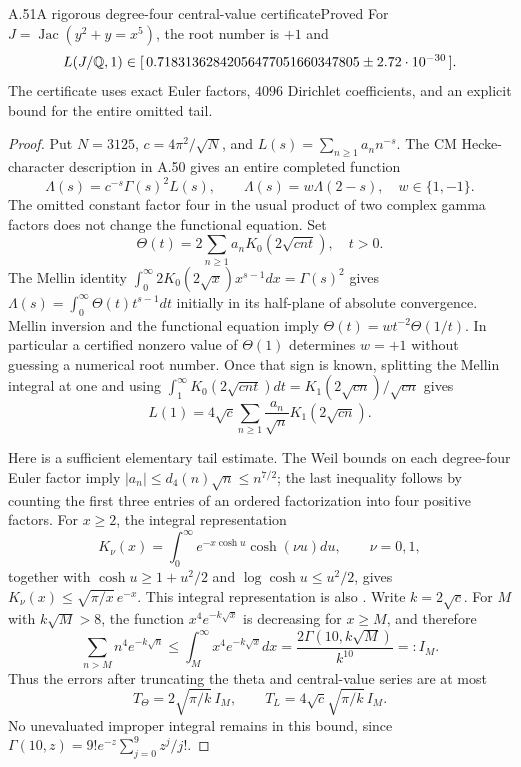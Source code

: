 \begin{statement}{A.51}{A rigorous degree-four central-value certificate}{Proved}
For $J=\operatorname{Jac}(y^2+y=x^5)$, the root number is $+1$ and
\[
 L(J/\mathbb Q,1)\in
 [\,0.71831362842056477051660347805
       \mathbin{\pm}2.72\cdot10^{-30}\,].
\]
The certificate uses exact Euler factors, $4096$ Dirichlet coefficients,
and an explicit bound for the entire omitted tail.
\end{statement}
\begin{proof}
Put $N=3125$, $c=4\pi^2/\sqrt N$, and
$L(s)=\sum_{n\ge1}a_nn^{-s}$. The CM Hecke-character description in A.50
gives an entire completed function
\[
 \Lambda(s)=c^{-s}\Gamma(s)^2L(s),\qquad
 \Lambda(s)=w\Lambda(2-s),\quad w\in\{1,-1\}.
\]
The omitted constant factor four in the usual product of two complex
gamma factors does not change the functional equation. Set
\[
 \Theta(t)=2\sum_{n\ge1}a_nK_0(2\sqrt{cnt}),\quad t>0.
\]
The Mellin identity
$\int_0^\infty2K_0(2\sqrt x)x^{s-1}dx=\Gamma(s)^2$
gives
$\Lambda(s)=\int_0^\infty\Theta(t)t^{s-1}dt$ initially in its
half-plane of absolute convergence. Mellin inversion and the functional
equation imply
$\Theta(t)=wt^{-2}\Theta(1/t)$. In particular a certified nonzero
value of $\Theta(1)$ determines $w=+1$ without guessing a numerical
root number. Once that sign is known, splitting the Mellin integral
at one and using
$\int_1^\infty K_0(2\sqrt{cnt})dt
 =K_1(2\sqrt{cn})/\sqrt{cn}$ gives
\[
 L(1)=4\sqrt c\sum_{n\ge1}\frac{a_n}{\sqrt n}
           K_1(2\sqrt{cn}).
\]

Here is a sufficient elementary tail estimate. The Weil bounds on each
degree-four Euler factor imply
$|a_n|\le d_4(n)\sqrt n\le n^{7/2}$; the last inequality follows by
counting the first three entries of an ordered factorization into four
positive factors. For $x\ge2$, the integral representation
\[
 K_\nu(x)=\int_0^\infty e^{-x\cosh u}\cosh(\nu u)du,
 \qquad \nu=0,1,
\]
together with $\cosh u\ge1+u^2/2$ and
$\log\cosh u\le u^2/2$, gives
$K_\nu(x)\le\sqrt{\pi/x}\,e^{-x}$.
This integral representation is also
\citet[equation~10.32.9]{AMDLMF2026}.
Write $k=2\sqrt c$. For $M$ with $k\sqrt M>8$, the function
$x^4e^{-k\sqrt x}$ is decreasing for $x\ge M$, and therefore
\[
 \sum_{n>M}n^4e^{-k\sqrt n}
 \le\int_M^\infty x^4e^{-k\sqrt x}dx
 =\frac{2\Gamma(10,k\sqrt M)}{k^{10}}=:I_M.
\]
Thus the errors after truncating the theta and central-value series
are at most
\[
 T_\Theta=2\sqrt{\pi/k}\,I_M,\qquad
 T_L=4\sqrt c\sqrt{\pi/k}\,I_M.
\]
No unevaluated improper integral remains in this bound, since
$\Gamma(10,z)=9!e^{-z}\sum_{j=0}^9z^j/j!$.


\end{proof}
